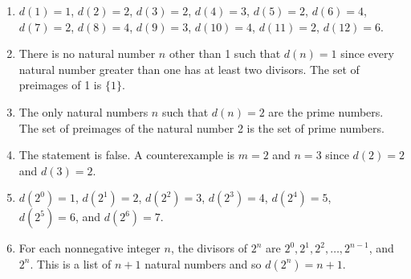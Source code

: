 \begin{list}{\bf{\ref{exer:numberofdivisors}.}}
\item \begin{enumerate}
\item $d ( 1 ) = 1$, $d ( 2 ) = 2$, $d ( 3 ) = 2$, $d ( 4 ) = 3$, $d(5) = 2$, $d(6) = 4$, $d(7) = 2$, $d ( 8 ) = 4$, $d ( 9 ) = 3$, $d(10) = 4$, $d(11) = 2$, $d(12) = 6$.

\item There is no natural number $n$ other than 1 such that $d ( n ) = 1$ since every natural number greater than one has at least two divisors.  The set of preimages of 1 is $\{1 \}$.

\item The only natural numbers  $n$  such that $d( n ) = 2$   are the prime numbers. The set of preimages of the natural number  2 is the set of prime numbers.

\item The statement is false.  A counterexample is $m = 2$ and $n = 3$ since 
$d( 2 ) = 2$ and $d( 3 ) = 2$.

\item $d \left( 2^0 \right) = 1$, $d \left( 2^1 \right) = 2$, $d \left( 2^2 \right) = 3$, 
$d \left( 2^3 \right) = 4$, $d \left( 2^4 \right) = 5$, \\
$d \left( 2^5 \right) = 6$, and $d \left( 2^6 \right) = 7$.

\item For each nonnegative integer $n$, the divisors of $2^n$ are $2^0, 2^1, 2^2, \ldots, 2^{n-1}$, and $2^n$.  This is a list of $n+1$ natural numbers and so $d(2^n) = n+1$.


\end{enumerate}
\end{list}
